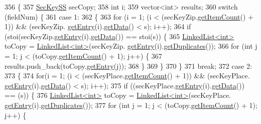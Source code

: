 \begin{DoxyCode}
356                                                        \{
357     \hyperlink{classSecKeySS}{SecKeySS} secCopy;
358     \textcolor{keywordtype}{int} i;
359     vector<int> results;
360     \textcolor{keywordflow}{switch} (fieldNum) \{
361     \textcolor{keywordflow}{case} 1:
362     \{
363         \textcolor{keywordflow}{for} (i = 1; (i < (secKeyZip.\hyperlink{classLinkedList_afc6635f854f48f2f126cf3b60d845220}{getItemCount}() + 1)) && (secKeyZip.
      \hyperlink{classLinkedList_a341bfd7772c9d24d29eb7a7f3936915b}{getEntry}(i).\hyperlink{classSecKeySS_add52510d280d0ca89b653386500f08f5}{getData}() < s); i++);
364         \textcolor{keywordflow}{if} (stoi(secKeyZip.\hyperlink{classLinkedList_a341bfd7772c9d24d29eb7a7f3936915b}{getEntry}(i).\hyperlink{classSecKeySS_add52510d280d0ca89b653386500f08f5}{getData}()) == stoi(s)) \{
365             \hyperlink{classLinkedList}{LinkedList<int>} toCopy = \hyperlink{classLinkedList}{LinkedList<int>}(secKeyZip.
      \hyperlink{classLinkedList_a341bfd7772c9d24d29eb7a7f3936915b}{getEntry}(i).\hyperlink{classSecKeySS_aaae9db891cfcdc3f78d8a44145f4f08c}{getDuplicates}());
366             \textcolor{keywordflow}{for} (\textcolor{keywordtype}{int} j = 1; j < (toCopy.\hyperlink{classLinkedList_afc6635f854f48f2f126cf3b60d845220}{getItemCount}() + 1); j++) \{
367                 results.push\_back(toCopy.\hyperlink{classLinkedList_a341bfd7772c9d24d29eb7a7f3936915b}{getEntry}(j));
368             \}
369         \}
370     \}
371     \textcolor{keywordflow}{break};
372     \textcolor{keywordflow}{case} 2:
373     \{
374         \textcolor{keywordflow}{for}(i = 1; (i < (secKeyPlace.\hyperlink{classLinkedList_afc6635f854f48f2f126cf3b60d845220}{getItemCount}() + 1)) && (secKeyPlace.
      \hyperlink{classLinkedList_a341bfd7772c9d24d29eb7a7f3936915b}{getEntry}(i).\hyperlink{classSecKeySS_add52510d280d0ca89b653386500f08f5}{getData}() < s); i++);
375         \textcolor{keywordflow}{if} ((secKeyPlace.\hyperlink{classLinkedList_a341bfd7772c9d24d29eb7a7f3936915b}{getEntry}(i).\hyperlink{classSecKeySS_add52510d280d0ca89b653386500f08f5}{getData}()) == (s)) \{
376             \hyperlink{classLinkedList}{LinkedList<int>} toCopy = \hyperlink{classLinkedList}{LinkedList<int>}(secKeyPlace.
      \hyperlink{classLinkedList_a341bfd7772c9d24d29eb7a7f3936915b}{getEntry}(i).\hyperlink{classSecKeySS_aaae9db891cfcdc3f78d8a44145f4f08c}{getDuplicates}());
377             \textcolor{keywordflow}{for} (\textcolor{keywordtype}{int} j = 1; j < (toCopy.\hyperlink{classLinkedList_afc6635f854f48f2f126cf3b60d845220}{getItemCount}() + 1); j++) \{

\end{DoxyCode}
